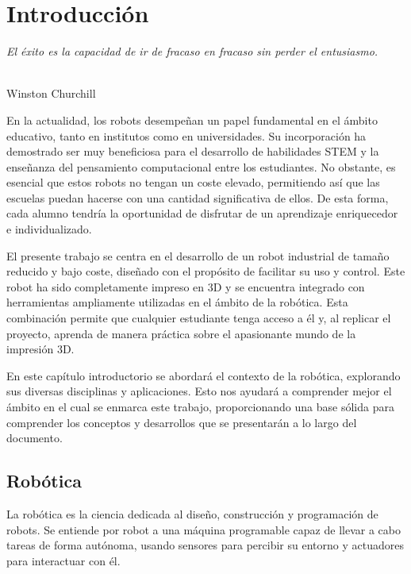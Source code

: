 \chapter{Introducción}
\label{cap:capitulo1}
\setcounter{page}{1}

\begin{flushright}
\begin{minipage}[]{10cm}
\emph{El éxito es la capacidad de ir de fracaso en fracaso sin perder el entusiasmo.}\\
\end{minipage}\\

Winston Churchill\\
\end{flushright}
\vspace{2cm}
\noindent En la actualidad, los robots desempeñan un papel fundamental en el ámbito educativo, tanto en institutos como en universidades. Su 
incorporación ha demostrado ser muy beneficiosa para el desarrollo de habilidades \acs{STEM} y la enseñanza del pensamiento computacional 
entre los estudiantes. No obstante, es esencial que estos robots no tengan un coste elevado, permitiendo así que las escuelas puedan hacerse 
con una cantidad significativa de ellos. De esta forma, cada alumno tendría la oportunidad de disfrutar de un aprendizaje enriquecedor e individualizado.

El presente trabajo se centra en el desarrollo de un robot industrial de tamaño reducido y bajo coste, diseñado con el propósito de 
facilitar su uso y control. Este robot ha sido completamente impreso en 3D y se encuentra integrado con herramientas ampliamente 
utilizadas en el ámbito de la robótica. Esta combinación permite que cualquier estudiante tenga acceso a él y, al replicar el proyecto, 
aprenda de manera práctica sobre el apasionante mundo de la impresión 3D.

En este capítulo introductorio se abordará el contexto de la robótica, explorando sus diversas disciplinas y aplicaciones. Esto nos ayudará a 
comprender mejor el ámbito en el cual se enmarca este trabajo, proporcionando una base sólida para comprender los conceptos y desarrollos que 
se presentarán a lo largo del documento.

\newpage
\section{Robótica}
\label{sec:rob}
\noindent La robótica es la ciencia dedicada al diseño, construcción y programación de robots. Se entiende por 
robot a una máquina programable capaz de llevar a cabo tareas de forma autónoma, usando sensores para percibir su entorno y 
actuadores para interactuar con él.

